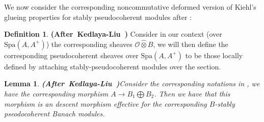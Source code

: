 \documentclass[12pt]{amsart}
\newtheorem{lemma}[theorem]{Lemma}
\theoremstyle{definition}
\newtheorem{definition}[theorem]{Definition}
\numberwithin{equation}{section}
\begin{document}
\indent We now consider the corresponding noncommutative deformed version of Kiehl's glueing properties for stably pseudocoherent modules after \cite{KL2}:



\begin{definition} \mbox{\bf{(After Kedlaya-Liu \cite[Definition 2.5.3]{KL2})}}
Consider in our context (over $\mathrm{Spa}(A,A^+)$) the corresponding sheaves $\mathcal{O}\widehat{\otimes}B$, we will then define the corresponding pseudocoherent sheaves over $\mathrm{Spa}(A,A^+)$ to be those locally defined by attaching stably-pseudocoherent modules over the section. 
\end{definition}



\begin{lemma} \mbox{\bf{(After Kedlaya-Liu \cite[Lemma 2.5.4]{KL2})}}\label{lemma2.13}
	Consider the corresponding notations in \cite[Lemma 2.4.10]{KL2}, we have the corresponding morphism $A\rightarrow B_1\bigoplus B_2$. Then we have that this morphism is an descent morphism effective for the corresponding $B$-stably pseodocoherent Banach modules. 
\end{lemma}
\end{document}

